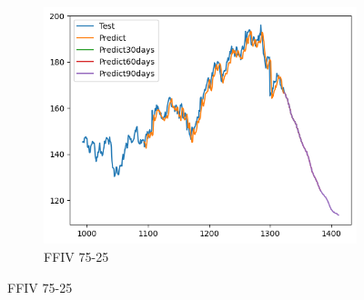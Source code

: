 \documentclass{ieeeojies}
\begin{document}
\begin{figure}[H]
\begin{subfigure}[h]{0.33\linewidth}
        \centering
        \includegraphics[width=\linewidth]{RNN Plot/RNN_FFIV_75_25.png}
        \caption{FFIV 75-25}
        \label{fig:ffiv-75-25}
    \end{subfigure}
    \vspace{10pt}
\end{figure}
\end{document}

